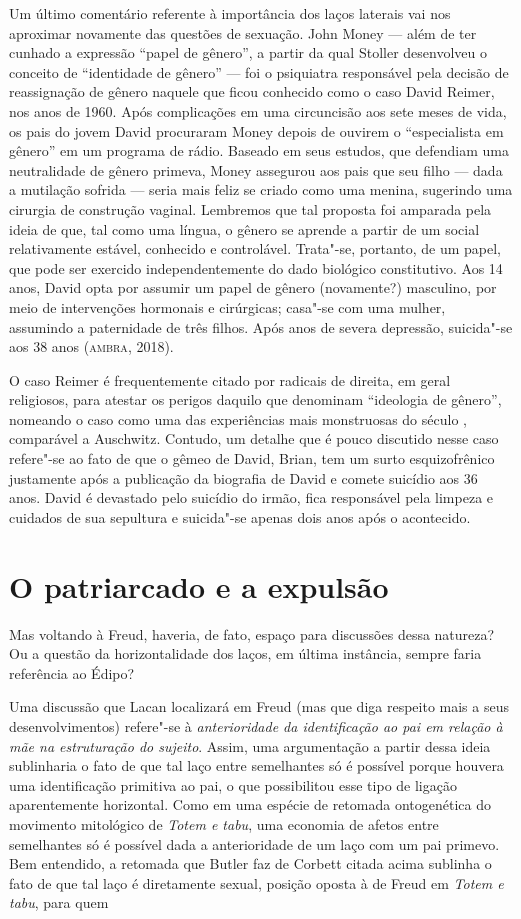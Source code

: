 Um último comentário referente à importância dos laços laterais vai nos
aproximar novamente das questões de sexuação. John Money --- além de ter
cunhado a expressão ``papel de gênero'', a partir da qual Stoller
desenvolveu o conceito de ``identidade de gênero'' --- foi o psiquiatra
responsável pela decisão de reassignação de gênero naquele que ficou
conhecido como o caso David Reimer, nos anos de 1960. Após complicações
em uma circuncisão aos sete meses de vida, os pais do jovem David
procuraram Money depois de ouvirem o ``especialista em gênero'' em um
programa de rádio. Baseado em seus estudos, que defendiam uma
neutralidade de gênero primeva, Money assegurou aos pais que seu filho
--- dada a mutilação sofrida --- seria mais feliz se criado como uma
menina, sugerindo uma cirurgia de construção vaginal. Lembremos que tal
proposta foi amparada pela ideia de que, tal como uma língua, o gênero
se aprende a partir de um social relativamente estável, conhecido e
controlável. Trata"-se, portanto, de um papel, que pode ser exercido
independentemente do dado biológico constitutivo. Aos 14 anos, David
opta por assumir um papel de gênero (novamente?) masculino, por meio de
intervenções hormonais e cirúrgicas; casa"-se com uma mulher, assumindo a
paternidade de três filhos. Após anos de severa depressão, suicida"-se
aos 38 anos (\textsc{ambra}, 2018).

O caso Reimer é frequentemente citado por radicais de direita, em geral
religiosos, para atestar os perigos daquilo que denominam ``ideologia de
gênero'', nomeando o caso como uma das experiências mais monstruosas do
século , comparável a Auschwitz. Contudo, um detalhe que é pouco
discutido nesse caso refere"-se ao fato de que o gêmeo de David, Brian,
tem um surto esquizofrênico justamente após a publicação da biografia de
David e comete suicídio aos 36 anos. David é devastado pelo suicídio do
irmão, fica responsável pela limpeza e cuidados de sua sepultura e
suicida"-se apenas dois anos após o acontecido.

\section{O patriarcado e a expulsão}

Mas voltando à Freud, haveria, de fato, espaço para discussões dessa
natureza? Ou a questão da horizontalidade dos laços, em última
instância, sempre faria referência ao Édipo?

Uma discussão que Lacan localizará em Freud (mas que diga respeito mais
a seus desenvolvimentos) refere"-se à \emph{anterioridade da
identificação ao pai em relação à mãe na estruturação do sujeito}.
Assim, uma argumentação a partir dessa ideia sublinharia o fato de que
tal laço entre semelhantes só é possível porque houvera uma
identificação primitiva ao pai, o que possibilitou esse tipo de ligação
aparentemente horizontal. Como em uma espécie de retomada ontogenética
do movimento mitológico de \emph{Totem e tabu}, uma economia de afetos
entre semelhantes só é possível dada a anterioridade de um laço com um
pai primevo. Bem entendido, a retomada que Butler faz de Corbett citada
acima sublinha o fato de que tal laço é diretamente sexual, posição
oposta à de Freud em \emph{Totem e tabu}, para quem

